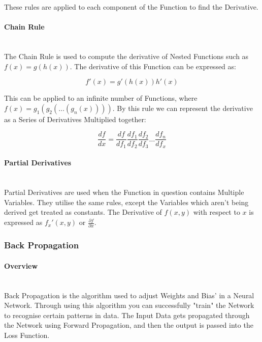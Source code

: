 \begin{flushleft}
                    These rules are applied to each component of the Function to find the Derivative. 

                \paragraph{Chain Rule}  \mbox{} \\
                    \vspace{0.2cm}
                    The Chain Rule is used to compute the derivative of Nested Functions such as $f(x) = g(h(x))$. The derivative of this Function can be expressed as: \\
                    \vspace{0.4cm}

                    \[f'(x) =  g'(h(x))h'(x)\]

                    \vspace{0.4cm}

                    This can be applied to an infinite number of Functions, where $f(x) = g_{1}(g_{2}(\hdots(g_{n}(x))))$. By this rule we can represent the derivative as
                    a Series of Derivatives Multiplied together:

                    \[
                        \frac{df}{dx} = \frac{df}{df_{1}} \frac{df_{1}}{df_{2}} \frac{df_{2}}{df_{3}} \hdots \frac{df_{n}}{df_{x}}
                    \]

                \paragraph{Partial Derivatives}  \mbox{} \\
                    \vspace{0.2cm}
                    Partial Derivatives are used when the Function in question contains Multiple Variables. They utilise the same rules, except the Variables
                    which aren't being derived get treated as constants. The Derivative of $f(x, y)$ with respect to $x$ is expressed as $f_{x}'(x,y)$ or 
                    {\Large $\frac{\partial f}{\partial x}$}. 
            \subsubsection{Back Propagation}
                \paragraph{Overview} \mbox{} \\
                    Back Propagation is the algorithm used to adjust Weights and Bias' in a Neural Network. Through using this algorithm you can successfully "train"
                    the Network to recognise certain patterns in data. The Input Data gets propagated through the Network using Forward Propagation, and then the output
                    is passed into the Loss Function.


\end{flushleft}
